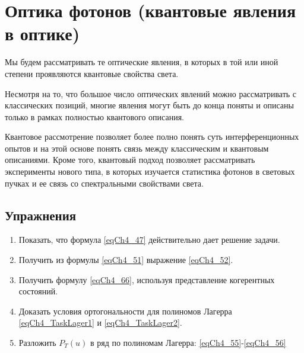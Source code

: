 \chapter{Оптика фотонов (квантовые явления в оптике)}
\label{chOptic}
Мы будем рассматривать те оптические явления, в которых в той или иной
степени проявляются квантовые свойства света. 

Несмотря на то, что большое число оптических явлений можно
рассматривать с классических позиций, многие явления могут быть до
конца поняты и описаны только в рамках полностью квантового описания. 

Квантовое рассмотрение позволяет более полно понять суть
интерференционных опытов и на этой основе понять связь между
классическим и квантовым описаниями. Кроме того, квантовый подход
позволяет рассматривать эксперименты нового типа, в которых изучается
статистика фотонов в световых пучках и ее связь со спектральными
свойствами света.  












\section{Упражнения}
\begin{enumerate}
\item Показать, что формула \eqref{eqCh4_47} действительно дает
  решение задачи. 
\item Получить из формулы \eqref{eqCh4_51} выражение \eqref{eqCh4_52}.
\item Получить формулу \eqref{eqCh4_66}, используя представление
  когерентных состояний.  
\item Доказать условия ортогональности для полиномов Лагерра
  \eqref{eqCh4_TaskLager1} и \eqref{eqCh4_TaskLager2}.
\item Разложить $P_T\left(u\right)$ в ряд по полиномам Лагерра:
  \eqref{eqCh4_55}-\eqref{eqCh4_56}
\end{enumerate}


